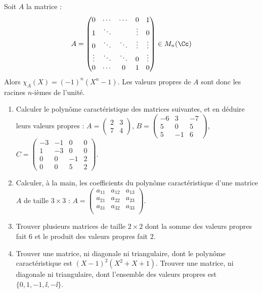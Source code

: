 \documentclass[11pt, class=report,crop=false]{standalone}
\begin{document}
\begin{exemple}
Soit $A$ la matrice :
$$A = 
\begin{pmatrix}
0&\cdots&\cdots&0&1\\
1&\ddots&&\vdots&0\\
0&\ddots&\ddots&\vdots&\vdots\\
\vdots&\ddots&\ddots&0&\vdots\\
0&\cdots&0&1&0
\end{pmatrix}
\in M_n(\Cc)
$$
Alors $\chi_A(X) = (-1)^n(X^n-1)$.
Les valeurs propres de $A$ sont donc les racines $n$-ièmes de l'unité.
\end{exemple}




\begin{miniexercices}
\sauteligne
\begin{enumerate}
  \item Calculer le polynôme caractéristique des matrices suivantes, et en déduire leurs valeurs propres : 
  $A = \left(\begin{smallmatrix}2 & 3 \\7 & 4 \end{smallmatrix}\right)$,
  $B = \left(\begin{smallmatrix}-6 & 3 & -7 \\5 & 0 & 5 \\5 & -1 & 6 \end{smallmatrix}\right)$,   
  $C = \left(\begin{smallmatrix}-3 & -1 & 0 & 0 \\1 & -3 & 0 & 0 \\0 & 0 & -1 & 2 \\0 & 0 & 5 & 2 \end{smallmatrix}\right)$. 
   
  \item Calculer, à la main, les coefficients du polynôme caractéristique d'une matrice $A$ de taille
  $3\times3$ :
  $A = \left(\begin{smallmatrix}a_{11}&a_{12}&a_{13}\\a_{21}&a_{22}&a_{23}\\a_{31}&a_{32}&a_{33}\\ \end{smallmatrix}\right)$. 
  
  \item Trouver plusieurs matrices de taille $2\times2$ dont la somme des valeurs propres fait $6$ et le produit des valeurs propres fait $2$.
  
  \item Trouver une matrice, ni diagonale ni triangulaire, dont le polynôme caractéristique est 
  $(X-1)^2(X^2+X+1)$. 
  Trouver une matrice, ni diagonale ni triangulaire, dont l'ensemble des valeurs propres est $\{0,1,-1,\ii,-\ii\}$.

\end{enumerate}
\end{miniexercices}
\end{document}
